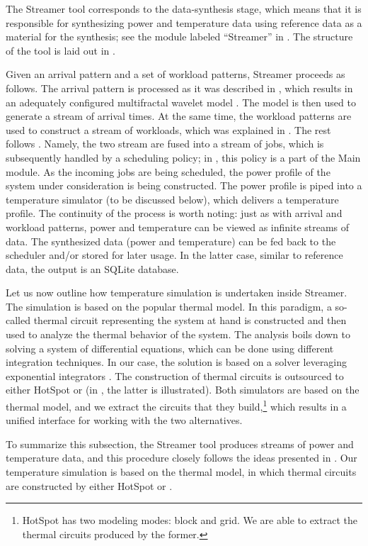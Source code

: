 
The Streamer tool corresponds to the data-synthesis stage, which means that it
is responsible for synthesizing power and temperature data using reference data
as a material for the synthesis; see the module labeled ``Streamer'' in
. The structure of the tool is laid out in .

Given an arrival pattern and a set of workload patterns, Streamer proceeds as
follows. The arrival pattern is processed as it was described in ,
which results in an adequately configured multifractal wavelet model
\cite{riedi1999}. The model is then used to generate a stream of arrival times.
At the same time, the workload patterns are used to construct a stream of
workloads, which was explained in . The rest follows
. Namely, the two stream are fused into a stream of jobs,
which is subsequently handled by a scheduling policy; in , this
policy is a part of the Main module. As the incoming jobs are being scheduled,
the power profile of the system under consideration is being constructed. The
power profile is piped into a temperature simulator (to be discussed below),
which delivers a temperature profile. The continuity of the process is worth
noting: just as with arrival and workload patterns, power and temperature can be
viewed as infinite streams of data. The synthesized data (power and temperature)
can be fed back to the scheduler and/or stored for later usage. In the latter
case, similar to reference data, the output is an SQLite database.

Let us now outline how temperature simulation is undertaken inside Streamer. The
simulation is based on the popular thermal  model. In this paradigm, a
so-called thermal  circuit representing the system at hand is constructed
and then used to analyze the thermal behavior of the system. The analysis boils
down to solving a system of differential equations, which can be done using
different integration techniques. In our case, the solution is based on a solver
leveraging exponential integrators \cite{hochbruck2010, ukhov2012}. The
construction of thermal circuits is outsourced to either HotSpot
\cite{skadron2004} or  \cite{sridhar2010} (in , the
latter is illustrated). Both simulators are based on the thermal  model,
and we extract the circuits that they build,\footnote{HotSpot has two modeling
modes: block and grid. We are able to extract the thermal circuits produced by
the former.} which results in a unified interface for working with the two
alternatives.

To summarize this subsection, the Streamer tool produces streams of power and
temperature data, and this procedure closely follows the ideas presented in
. Our temperature simulation is based on the thermal 
model, in which thermal circuits are constructed by either HotSpot or
.

